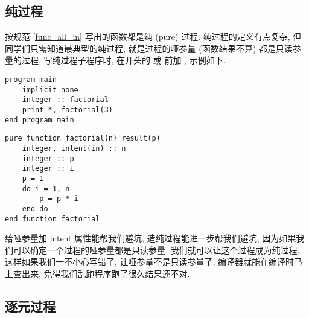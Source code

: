 \subsection{纯过程}\label{pure_procedure}

按规范 \ref{func_all_in} 写出的函数都是纯 (pure) 过程. 纯过程的定义有点复杂, 但同学们只需知道最典型的纯过程, 就是过程的哑参量 (函数结果不算) 都是只读参量的过程. 写纯过程子程序时, 在开头的  或  前加 , 示例如下.
\begin{lstlisting}
program main
    implicit none
    integer :: factorial
    print *, factorial(3)
end program main
\end{lstlisting}
\begin{lstlisting}
pure function factorial(n) result(p)
    integer, intent(in) :: n
    integer :: p
    integer :: i 
    p = 1
    do i = 1, n
        p = p * i
    end do
end function factorial
\end{lstlisting}
给哑参量加 intent 属性能帮我们避坑, 造纯过程能进一步帮我们避坑, 因为如果我们可以确定一个过程的哑参量都是只读参量, 我们就可以让这个过程成为纯过程, 这样如果我们一不小心写错了, 让哑参量不是只读参量了, 编译器就能在编译时马上查出来, 免得我们乱跑程序跑了很久结果还不对. 

\subsection{逐元过程}\label{elemental_procedure}

